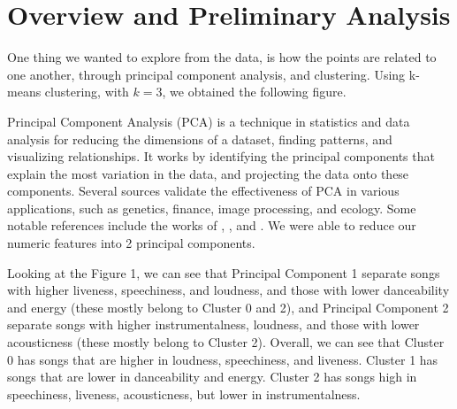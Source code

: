 \section{Overview and Preliminary Analysis}

One thing we wanted to explore from the data, is how the points are related to one another, through principal component analysis, and clustering. Using k-means clustering, with $k = 3$, we obtained the following figure.

Principal Component Analysis (PCA) is a technique in statistics and data analysis for reducing the dimensions of a dataset, finding patterns, and visualizing relationships. It works by identifying the principal components that explain the most variation in the data, and projecting the data onto these components. Several sources validate the effectiveness of PCA in various applications, such as genetics, finance, image processing, and ecology. Some notable references include the works of \cite{jolliffe2002principal}, \cite{hotelling1933analysis}, and \cite{pearson1901lines}. We were able to reduce our numeric features into 2 principal components.

Looking at the Figure 1, we can see that Principal Component 1 separate songs with higher liveness, speechiness, and loudness, and those with lower danceability and energy (these mostly belong to Cluster 0 and 2), and Principal Component 2 separate songs with higher instrumentalness, loudness, and those with lower acousticness (these mostly belong to Cluster 2). Overall, we can see that Cluster 0 has songs that are higher in loudness, speechiness, and liveness. Cluster 1 has songs that are lower in danceability and energy. Cluster 2 has songs high in speechiness, liveness, acousticness, but lower in instrumentalness.